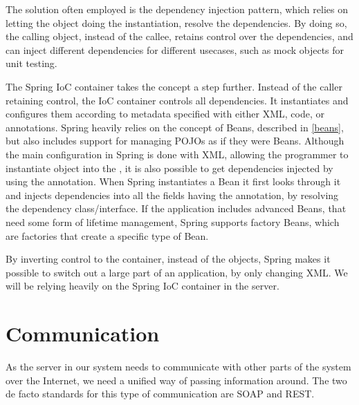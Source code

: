 The solution often employed is the dependency injection pattern, which relies on letting the object doing the instantiation, resolve the dependencies.
By doing so, the calling object, instead of the callee, retains control over the dependencies, and can inject different dependencies for different usecases, such as mock objects for unit testing.

The Spring \ac{IoC} container takes the concept a step further.
Instead of the caller retaining control, the \ac{IoC} container controls all dependencies.
It instantiates and configures them according to metadata specified with either XML, code, or annotations.
Spring heavily relies on the concept of Beans, described in \cref{beans}, but also includes support for managing \acp{POJO} as if they were Beans.
Although the main configuration in Spring is done with XML, allowing the programmer to instantiate object into the , it is also possible to get dependencies injected by using the  annotation.
When Spring instantiates a Bean it first looks through it and injects dependencies into all the fields having the  annotation, by resolving the dependency class/interface.
If the application includes advanced Beans, that need some form of lifetime management, Spring supports factory Beans, which are factories that create a specific type of Bean.

By inverting control to the container, instead of the objects, Spring makes it possible to switch out a large part of an application, by only changing XML.
We will be relying heavily on the Spring \ac{IoC} container in the server.

\section{Communication}\label{communication}
\label{subsec:tech_communication}
As the server in our system needs to communicate with other parts of the system over the Internet, we need a unified way of passing information around.
The two de facto standards for this type of communication are SOAP and REST.

